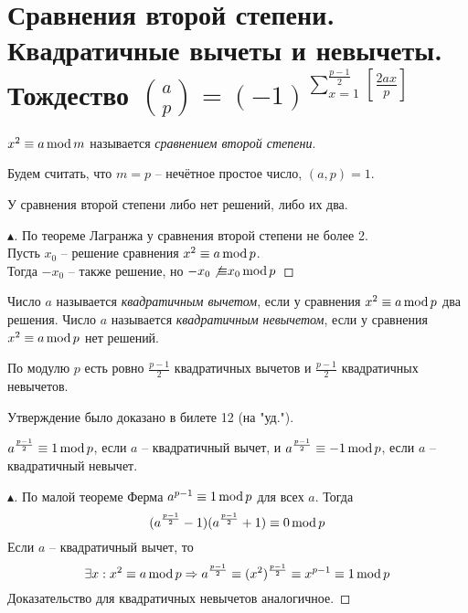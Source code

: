 \setcounter{section}{50}
\section{Сравнения второй степени. Квадратичные вычеты и невычеты. Тождество $\binom{a}{p} = (-1)^{ \sum \limits_{x=1}^{ \frac{p-1}{2} } \left[ \frac{2ax}{p} \right] }$}

\begin{definition}
    $x^2 \equiv a \operatorname{mod}{m}$ называется \textit{сравнением второй степени}.
\end{definition}
Будем считать, что $m = p$ -- нечётное простое число, $(a, p) = 1$.
\begin{note}
    У сравнения второй степени либо нет решений, либо их два.
    \begin{proof}[$\blacktriangle$]
        По теореме Лагранжа у сравнения второй степени не более 2.\\
        Пусть $x_0$ -- решение сравнения $x^2 \equiv a \operatorname{mod}{p}$.\\
        Тогда $-x_0$ -- также решение, но $-x_0 \not{\equiv} x_0 \operatorname{mod}{p}$
    \end{proof}
\end{note}

\begin{definition}
    Число $a$ называется \textit{квадратичным вычетом}, если у сравнения $x^2 \equiv a \operatorname{mod}{p}$ два решения.
    Число $a$ называется \textit{квадратичным невычетом}, если у сравнения $x^2 \equiv a \operatorname{mod}{p}$ нет решений.
\end{definition}

\begin{proposition}
    По модулю $p$ есть ровно $\frac{p - 1}{2}$ квадратичных вычетов и $\frac{p - 1}{2}$ квадратичных невычетов.
\end{proposition}

    Утверждение было доказано в билете 12 (на "уд.").

\begin{theorem}
     $a^{ \frac{p - 1}{2} } \equiv 1 \operatorname{mod}{p}$, если $a$ -- квадратичный вычет, и $a^{ \frac{p - 1}{2} } \equiv -1 \operatorname{mod}{p}$, если $a$ -- квадратичный невычет.
    \begin{proof}[$\blacktriangle$]
        По малой теореме Ферма $a^{p-1} \equiv 1 \operatorname{mod}{p}$ для всех $a$. Тогда
        $$
            (a^{ \frac{p - 1}{2} } - 1)(a^{ \frac{p - 1}{2} } + 1) \equiv 0 \operatorname{mod}{p}
        $$
        Если $a$ -- квадратичный вычет, то 
        $$
        \exists x : x^2 \equiv a \operatorname{mod}{p} \Rightarrow a^{ \frac{p - 1}{2} } \equiv (x^2)^{ \frac{p - 1}{2} } \equiv x^{p - 1} \equiv 1 \operatorname{mod}{p}
        $$
        Доказательство для квадратичных невычетов аналогичное.
    \end{proof}
\end{theorem}

